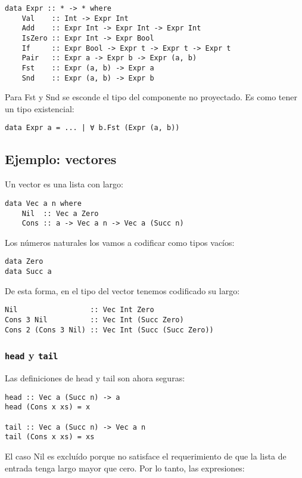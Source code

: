 \documentclass{article}
\newcommand{\imp}[1]{\textcolor{color1}{#1}}
\begin{document}
\begin{lstlisting}
data Expr :: * -> * where
    Val    :: Int -> Expr Int
    Add    :: Expr Int -> Expr Int -> Expr Int
    IsZero :: Expr Int -> Expr Bool
    If     :: Expr Bool -> Expr t -> Expr t -> Expr t
    Pair   :: Expr a -> Expr b -> Expr (a, b)
    Fst    :: Expr (a, b) -> Expr a
    Snd    :: Expr (a, b) -> Expr b
\end{lstlisting}

Para \imp{Fst} y \imp{Snd} se esconde el tipo del componente no proyectado.
Es como tener un tipo existencial:

\begin{lstlisting}
data Expr a = ... | ∀ b.Fst (Expr (a, b))
\end{lstlisting}

\subsection{Ejemplo: vectores}

Un vector es una lista con largo:

\begin{lstlisting}
data Vec a n where
    Nil  :: Vec a Zero
    Cons :: a -> Vec a n -> Vec a (Succ n)
\end{lstlisting}
Los números naturales los vamos a codificar como tipos vacíos:
\begin{lstlisting}
data Zero
data Succ a
\end{lstlisting}
De esta forma, en el tipo del vector tenemos codificado su largo:
\begin{lstlisting}
Nil                 :: Vec Int Zero
Cons 3 Nil          :: Vec Int (Succ Zero)
Cons 2 (Cons 3 Nil) :: Vec Int (Succ (Succ Zero))
\end{lstlisting}

\subsubsection{\texttt{head} y \texttt{tail}}

Las definiciones de head y tail son ahora seguras:

\begin{lstlisting}
head :: Vec a (Succ n) -> a
head (Cons x xs) = x

tail :: Vec a (Succ n) -> Vec a n
tail (Cons x xs) = xs
\end{lstlisting}

El caso Nil es excluído porque no satisface el requerimiento de que la lista de entrada tenga largo mayor que cero. Por lo tanto, las expresiones:
\end{document}
